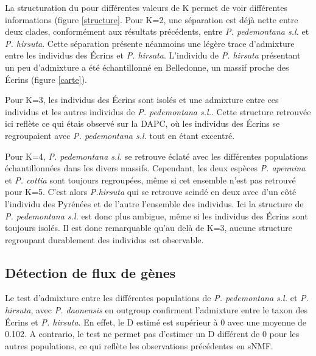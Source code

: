 La structuration du  pour différentes valeurs de K permet de voir différentes informations (figure \ref{structure}. Pour K=2, une séparation est déjà nette entre deux clades, conformément aux résultats précédents, entre \textit{P. pedemontana s.l.} et \textit{P. hirsuta}. Cette séparation présente néanmoins une légère trace d'admixture entre les individus des Écrins et \textit{P. hirsuta}. L'individu de \textit{P. hirsuta} présentant un peu d'admixture a été échantillonné en Belledonne, un massif proche des Écrins (figure \ref{carte}).

Pour K=3, les individus des Écrins sont isolés et une admixture entre ces individus et les autres individus de \textit{P. pedemontana s.l.}. Cette structure retrouvée ici reflète ce qui étais observé sur la DAPC, où les individus des Écrins se regroupaient avec \textit{P. pedemontana s.l.} tout en étant excentré.

Pour K=4, \textit{P. pedemontana s.l.} se retrouve éclaté avec les différentes populations échantillonnées dans les divers massifs. Cependant, les deux espèces \textit{P. apennina} et \textit{P. cottia} sont toujours regroupées, même si cet ensemble n'est pas retrouvé pour K=5. C'est alors \textit{P.hirsuta} qui se retrouve scindé en deux avec d'un côté l'individu des Pyrénées et de l'autre l'ensemble des individus. Ici la structure de \textit{P. pedemontana s.l.} est donc plus ambigue, même si les individus des Écrins sont toujours isolés. Il est donc remarquable qu'au delà de K=3, aucune structure regroupant durablement des individus est observable.


\subsection{Détection de flux de gènes}

Le test d'admixture entre les différentes populations de \textit{P. pedemontana s.l.} et \textit{P. hirsuta}, avec \textit{P. daonensis} en outgroup confirment l'admixture entre le taxon des Écrins et \textit{P. hirsuta}. En effet, le D estimé est supérieur à 0 avec une moyenne de 0.102. A contrario, le test ne permet pas d'estimer un D différent de 0 pour les autres populations, ce qui reflète les observations précédentes en sNMF.

